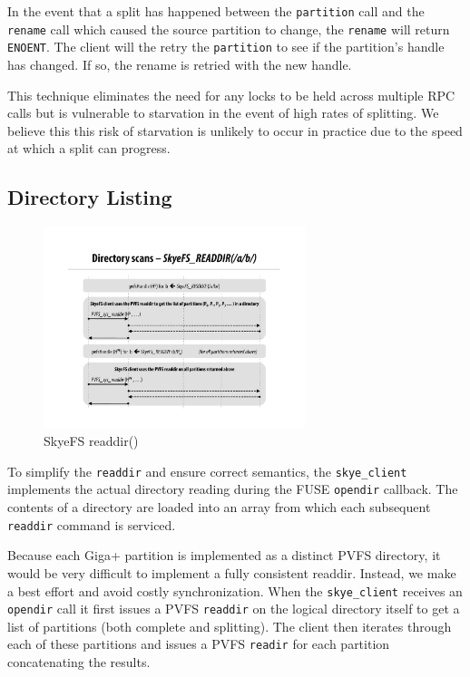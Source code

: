 \documentclass[twocolumn,letterpaper]{article}
\newcommand{\code}[1]{\texttt{#1}}
\begin{document}
In the event that a split has happened between the \code{partition} call and
the \code{rename} call which caused the source partition to change, the
\code{rename} will return \code{ENOENT}.  The client will the retry the
\code{partition} to see if the partition's handle has changed.  If so, the
rename is retried with the new handle.

This technique eliminates the need for any locks to be held across multiple RPC
calls but is vulnerable to starvation in the event of high rates of splitting.
We believe this this risk of starvation is unlikely to occur in practice due to
the speed at which a split can progress.

\subsection{Directory Listing}
\begin{figure}
\begin{center}
\includegraphics[width=3in]{figure-readdir}
\end{center}
\caption{SkyeFS readdir()}
\end{figure}
To simplify the \code{readdir} and ensure correct semantics, the
\code{skye\_client} implements the actual directory reading during the FUSE
\code{opendir} callback.  The contents of a directory are loaded into an array
from which each subsequent \code{readdir} command is serviced.

Because each Giga+ partition is implemented as a distinct PVFS directory, it
would be very difficult to implement a fully consistent readdir.  Instead, we
make a best effort and avoid costly synchronization.  When the
\code{skye\_client} receives an \code{opendir} call it first issues a PVFS
\code{readdir} on the logical directory itself to get a list of partitions
(both complete and splitting).  The client then iterates through each of these
partitions and issues a PVFS \code{readir} for each partition concatenating
the results.  
\end{document}
